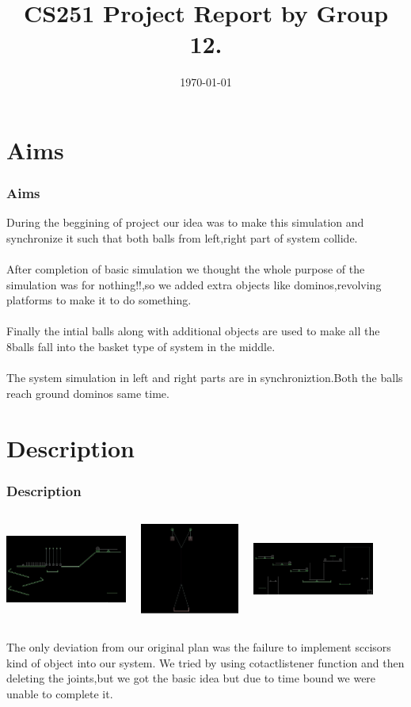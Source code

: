 \documentclass[t,compress,11pt,xcolor=dvipsnames]{beamer}
\title{ CS251 Project Report by Group 12.}
\author[Pramod  \&  Basith \& Nikhileswar  ]
{
   \texorpdfstring{
        \begin{columns}
            \column{.30\linewidth}
            \centering
            Pramod \\
            140050076 \\
            {140050076@itb.ac.in}
            \column{.30\linewidth}
            \centering
            Basith \\
             140050070 \\
             {140050070@itb.ac.in}
            \column{.30\linewidth}
            \centering
            Nikhileswar \\
             140050074 \\
            {140050074@itb.ac.in}
        \end{columns}
   }
   {John Doe \& Jane Doe}
   }
\date{\today}
\begin{document}
\section{Aims}
\begin{frame}
\frametitle{Aims}
During the beggining of project our idea was to make this simulation and synchronize it such that both balls from left,right part of system collide. \\~\\
After completion of basic simulation we thought the whole purpose of the simulation was for nothing!!,so we added extra objects like dominos,revolving platforms to make it to do something.\\~\\
Finally the intial balls along with additional objects are  used to make all the 8balls fall into the basket type of system in the middle.\\~\\
The system simulation in left and right parts are in synchroniztion.Both the balls reach ground dominos same time.
\end{frame}
\section{Description}
\begin{frame}
\frametitle{Description}
\begin{columns}[t]
\includegraphics[width=4cm,height=3cm]{left.jpg}
\includegraphics[width=4cm,height=3cm]{middle.jpg}
\includegraphics[width=4cm,height=3cm]{right.jpg}
\end{columns}
The only deviation from our original plan was the failure to implement sccisors kind of object into our system.
We tried by using cotactlistener function and then deleting the joints,but we got the basic idea but due to time bound we were unable to complete it.
\end{frame}
\end{document}
